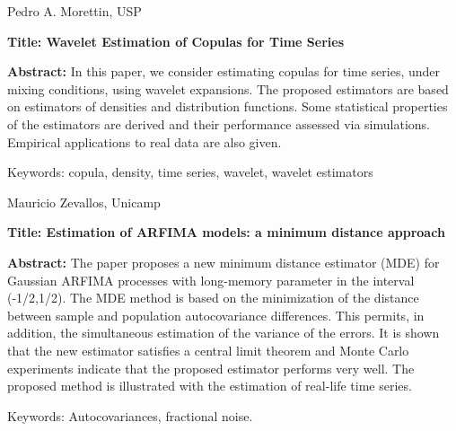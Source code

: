 \documentclass[11pt]{article}
\begin{document}
\newpage

{\large \sc Pedro A. Morettin, USP}


{\bf Title: Wavelet Estimation of Copulas for Time Series}

{\bf Abstract:} In this paper, we consider estimating copulas for time
series, under mixing conditions, using wavelet expansions. The
proposed estimators are based on estimators of densities and
distribution functions. Some statistical properties of the estimators
are derived and their performance assessed via simulations. Empirical
applications to real data are also given.

Keywords: copula, density, time series, wavelet, wavelet estimators


\newpage

{\large \sc Mauricio Zevallos, Unicamp}

{\bf Title: Estimation of ARFIMA models: a minimum distance approach}

{\bf Abstract:} The paper proposes a new minimum distance estimator
(MDE) for Gaussian ARFIMA processes with long-memory parameter in the
interval (-1/2,1/2).  The MDE method is based on the minimization of
the distance between sample and population autocovariance
differences. This permits, in addition, the simultaneous estimation of
the variance of the errors. It is shown that the new estimator
satisfies a central limit theorem and Monte Carlo experiments indicate
that the proposed estimator performs very well. The proposed method is
illustrated with the estimation of real-life time series.

Keywords: Autocovariances, fractional noise.
\end{document}
